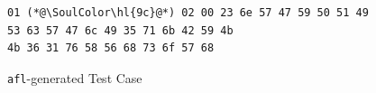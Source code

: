 \begin{frame}[fragile]
\begin{columns}[c]
\begin{center}
\begin{varwidth}{0.7\textwidth}
\begin{figure}
\vspace*{-1cm}
\begin{lstlisting}[numbers=none]
01 (*@\SoulColor\hl{9c}@*) 02 00 23 6e 57 47 59 50 51 49
53 63 57 47 6c 49 35 71 6b 42 59 4b
4b 36 31 76 58 56 68 73 6f 57 68\end{lstlisting}
\caption{\texttt{afl}-generated Test Case}
\end{figure}
\end{varwidth}
\end{center}


\end{columns}


\end{frame}
